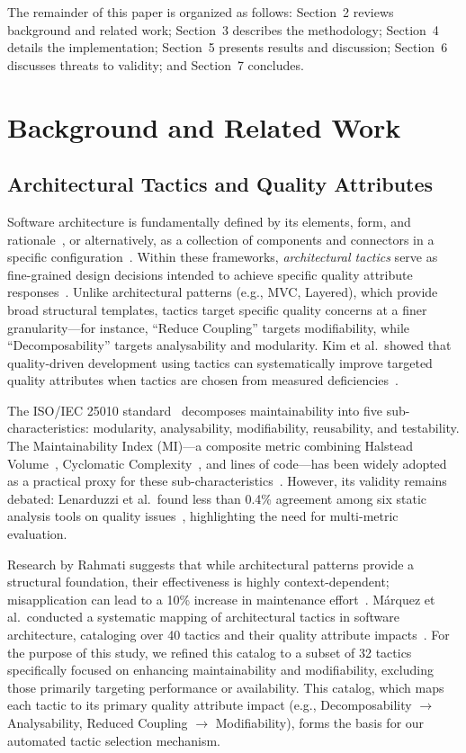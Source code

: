 \documentclass[runningheads]{llncs}
\begin{document}
The remainder of this paper is organized as follows: Section~2 reviews background and related work; Section~3 describes the methodology; Section~4 details the implementation; Section~5 presents results and discussion; Section~6 discusses threats to validity; and Section~7 concludes.

\section{Background and Related Work}

\subsection{Architectural Tactics and Quality Attributes}
Software architecture is fundamentally defined by its elements, form, and rationale~\cite{perry1992foundations}, or alternatively, as a collection of components and connectors in a specific configuration~\cite{garlan1993introduction}. Within these frameworks, \textit{architectural tactics} serve as fine-grained design decisions intended to achieve specific quality attribute responses~\cite{bass2021software}. Unlike architectural patterns (e.g., MVC, Layered), which provide broad structural templates, tactics target specific quality concerns at a finer granularity---for instance, ``Reduce Coupling'' targets modifiability, while ``Decomposability'' targets analysability and modularity. Kim et al.\ showed that quality-driven development using tactics can systematically improve targeted quality attributes when tactics are chosen from measured deficiencies~\cite{kim2009qualitydriven}.

The ISO/IEC 25010 standard~\cite{ISO25010} decomposes maintainability into five sub-characteristics: modularity, analysability, modifiability, reusability, and testability. The Maintainability Index (MI)---a composite metric combining Halstead Volume~\cite{halstead1977elements}, Cyclomatic Complexity~\cite{mccabe1976complexity}, and lines of code---has been widely adopted as a practical proxy for these sub-characteristics~\cite{oman1992maintainability}. However, its validity remains debated: Lenarduzzi et al.\ found less than 0.4\% agreement among six static analysis tools on quality issues~\cite{lenarduzzi2023critical}, highlighting the need for multi-metric evaluation.

Research by Rahmati suggests that while architectural patterns provide a structural foundation, their effectiveness is highly context-dependent; misapplication can lead to a 10\% increase in maintenance effort~\cite{rahmati2021ensuring}. M\'arquez et al.\ conducted a systematic mapping of architectural tactics in software architecture, cataloging over 40 tactics and their quality attribute impacts~\cite{marquez2022architectural}. For the purpose of this study, we refined this catalog to a subset of 32 tactics specifically focused on enhancing maintainability and modifiability, excluding those primarily targeting performance or availability. This catalog, which maps each tactic to its primary quality attribute impact (e.g., Decomposability $\rightarrow$ Analysability, Reduced Coupling $\rightarrow$ Modifiability), forms the basis for our automated tactic selection mechanism.
\end{document}
